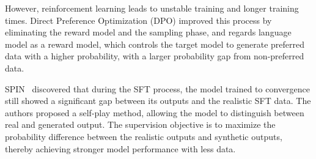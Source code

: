 {However, reinforcement learning leads to unstable training and longer training times. Direct Preference Optimization (DPO) improved this process by eliminating the reward model and the sampling phase, and regards language model as a reward model, which controls the target model to generate preferred data with a higher probability, with a larger probability gap from non-preferred data.
% 

SPIN~\cite{spin} discovered that during the SFT process, the model trained to convergence still showed a significant gap between its outputs and the realistic SFT data. The authors proposed a self-play method, allowing the model to distinguish between real and generated output. The supervision objective is to maximize the probability difference between the realistic outputs and synthetic outputs, thereby achieving stronger model performance with less data.
} %